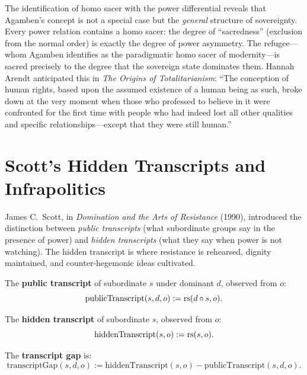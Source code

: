\begin{interpretation}
The identification of homo sacer with the power differential reveals that
Agamben's concept is not a special case but the \emph{general} structure of
sovereignty. Every power relation contains a homo sacer: the degree of
``sacredness'' (exclusion from the normal order) is exactly the degree of
power asymmetry. The refugee---whom Agamben identifies as the paradigmatic
homo sacer of modernity---is sacred precisely to the degree that the sovereign
state dominates them. Hannah Arendt anticipated this in \emph{The Origins of
Totalitarianism}: ``The conception of human rights, based upon the assumed
existence of a human being as such, broke down at the very moment when those
who professed to believe in it were confronted for the first time with people
who had indeed lost all other qualities and specific relationships---except
that they were still human.''
\end{interpretation}

\section{Scott's Hidden Transcripts and Infrapolitics}

James C.\ Scott, in \emph{Domination and the Arts of Resistance} (1990),
introduced the distinction between \emph{public transcripts} (what subordinate
groups say in the presence of power) and \emph{hidden transcripts} (what they
say when power is not watching). The hidden transcript is where resistance is
rehearsed, dignity maintained, and counter-hegemonic ideas cultivated.

\begin{definition}
\label{def:public-transcript}
The \textbf{public transcript} of subordinate $s$ under dominant $d$, observed from $o$:
\[
  \mathrm{publicTranscript}(s, d, o) := \mathrm{rs}(d \circ s, o).
\]
\end{definition}

\begin{definition}
\label{def:hidden-transcript}
The \textbf{hidden transcript} of subordinate $s$, observed from $o$:
\[
  \mathrm{hiddenTranscript}(s, o) := \mathrm{rs}(s, o).
\]
\end{definition}

\begin{definition}
\label{def:transcript-gap}
The \textbf{transcript gap} is:
\[
  \mathrm{transcriptGap}(s, d, o) := \mathrm{hiddenTranscript}(s, o) - \mathrm{publicTranscript}(s, d, o).
\]
\end{definition}

